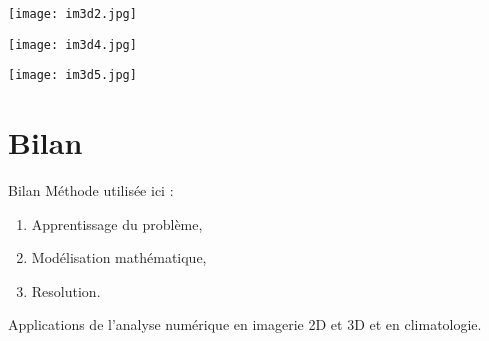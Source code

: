 \documentclass[11pt]{beamer}
\begin{document}
\begin{frame}
\begin{center}
\texttt{[image: im3d2.jpg]}
\end{center}
\end{frame}

\begin{frame}
\begin{center}
\texttt{[image: im3d4.jpg]}
\end{center}
\end{frame}

\begin{frame}
\begin{center}
\texttt{[image: im3d5.jpg]}
\end{center}
\end{frame}

\section{Bilan}
\begin{frame}{Bilan}
Méthode utilisée ici :
\begin{enumerate}
\item Apprentissage du problème,
\item Modélisation mathématique,
\item Resolution.
\end{enumerate}

Applications de l'analyse numérique en imagerie 2D et 3D et en climatologie.

\end{frame}
\end{document}
